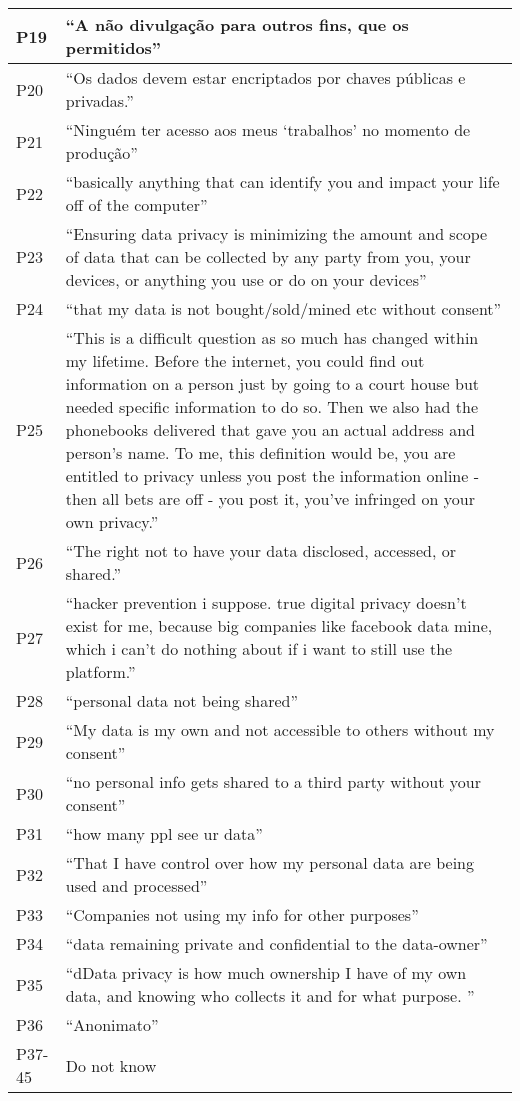 \begin{longtable}{p{3cm} p{13cm}}
    \hline
    P19 & ``A não divulgação para outros fins, que os permitidos'' \\
    \hline
    P20 & ``Os dados devem estar encriptados por chaves públicas e privadas.'' \\
    \hline
    P21 & ``Ninguém ter acesso aos meus `trabalhos' no momento de produção'' \\
    \hline
    P22 & ``basically anything that can identify you and impact your life off of the computer'' \\
    \hline
    P23 & ``Ensuring data privacy is minimizing the amount and scope of data that can be collected by any party from you, your devices, or anything you use or do on your devices'' \\
    \hline
    P24 & ``that my data is not bought/sold/mined etc without consent'' \\
    \hline
    P25 & ``This is a difficult question as so much has changed within my lifetime. Before the internet, you could find out information on a person just by going to a court house but needed specific information to do so. Then we also had the phonebooks delivered that gave you an actual address and person's name. To me, this definition would be, you are entitled to privacy unless you post the information online - then all bets are off - you post it, you've infringed on your own privacy.'' \\
    \hline
    P26 & ``The right not to have your data disclosed, accessed, or shared.'' \\
    \hline
    P27 & ``hacker prevention i suppose. true digital privacy doesn't exist for me, because big companies like facebook data mine, which i can't do nothing about if i want to still use the platform.'' \\
    \hline
    P28 & ``personal data not being shared'' \\
    \hline
    P29 & ``My data is my own and not accessible to others without my consent'' \\
    \hline
    P30 & ``no personal info gets shared to a third party without your consent'' \\
    \hline
    P31 & ``how many ppl see ur data'' \\
    \hline
    P32 & ``That I have control over how my personal data are being used and processed'' \\
    \hline
    P33 & ``Companies not using my info for other purposes'' \\
    \hline
    P34 & ``data remaining private and confidential to the data-owner'' \\
    \hline
    P35 & ``dData privacy is how much ownership I have of my own data, and knowing who collects it and for what purpose. '' \\
    \hline
    P36 & ``Anonimato'' \\
    \hline
    P37-45 & Do not know \\
    \hline
\end{longtable}

